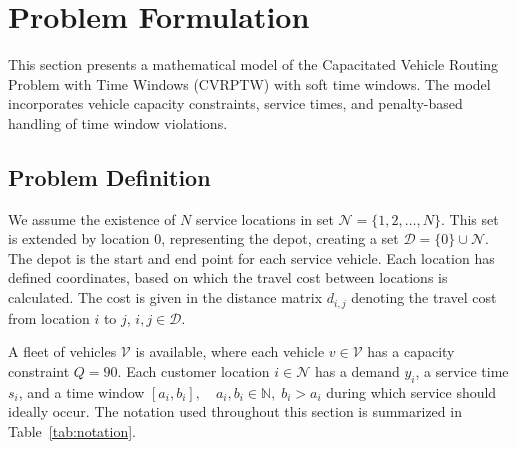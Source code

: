 
\section{Problem Formulation}

This section presents a mathematical model of the Capacitated Vehicle Routing Problem with Time Windows (CVRPTW) with soft time windows. The model incorporates vehicle capacity constraints, service times, and penalty-based handling of time window violations.


\subsection{Problem Definition}

We assume the existence of $N$ service locations in set $\mathcal{N} = \{1, 2, \dots, N\}$. This set is extended by location 0, representing the depot, creating a set $\mathcal{D} = \{0\} \cup \mathcal{N}$. The depot is the start and end point for each service vehicle. Each location has defined coordinates, based on which the travel cost between locations is calculated. The cost is given in the distance matrix $d_{i,j}$ denoting the travel cost from location $i$ to $j$, $i,j \in \mathcal{D}$.

A fleet of vehicles $\mathcal{V}$ is available, where each vehicle $v \in \mathcal{V}$ has a capacity constraint $Q=90$. Each customer location $i \in \mathcal{N}$ has a demand $y_i$, a service time $s_i$, and a time window $[a_i, b_i], \quad a_i, b_i \in \mathbb{N},\; b_i > a_i
$ during which service should ideally occur.  
The notation used throughout this section is summarized in Table~\ref{tab:notation}.

